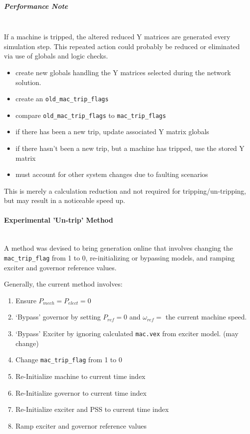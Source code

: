 \documentclass[12pt]{article}
\begin{document}
\subparagraph{Performance Note} \ \\
If a machine is tripped, the altered reduced Y matrices are generated every simulation step.
This repeated action could probably be reduced or eliminated via use of globals and logic checks.
\begin{itemize}
\item create new globals handling the Y matrices selected during the network solution.
\item create an \verb|old_mac_trip_flags|
\item compare \verb|old_mac_trip_flags| to \verb|mac_trip_flags|
\item if there has been a new trip, update associated Y matrix globals
\item if there hasn't been a new trip, but a machine has tripped, use the stored Y matrix
\item must account for other system changes due to faulting scenarios
\end{itemize} 
This is merely a calculation reduction and not required for tripping/un-tripping, but may result in a noticeable speed up.

\pagebreak
\paragraph{Experimental 'Un-trip' Method} \ \\
A method was devised to bring generation online that involves changing the \verb|mac_trip_flag| from 1 to 0, re-initializing or bypassing models, and  ramping exciter and governor reference values.

Generally, the current method involves:
\begin{enumerate}
 em
\item Ensure $P_{mech} = P_{elect} = 0$
\item `Bypass' governor by setting $P_{ref} = 0$ and $\omega_{ref} = $ the current machine speed.
\item `Bypass' Exciter by ignoring calculated \verb|mac.vex| from exciter model. (may change)
\item Change \verb|mac_trip_flag| from 1 to 0
\item Re-Initialize machine to current time index
\item Re-Initialize governor to current time index
\item Re-Initialize exciter and PSS to current time index
\item Ramp exciter and governor reference values
\end{enumerate}
\end{document}
